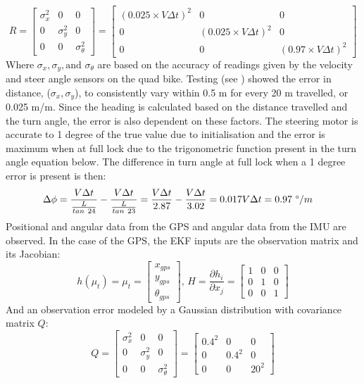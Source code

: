 \documentclass[main.tex]{subfiles}
\begin{document}
\[
R =
\begin{bmatrix}
    \sigma_x^2	&	0	&	0\\
    0	&	\sigma_y^2	&	0\\
    0	&	0	&	\sigma_\theta^2
\end{bmatrix}
=
\begin{bmatrix}
    (0.025 \times V\Delta t)^2	&	0	&	0\\
    0	&	(0.025 \times V\Delta t)^2	&	0\\
    0	&	0	&	(0.97 \times V\Delta t)^2
\end{bmatrix}
\]
Where $\sigma_x, \sigma_y, \textrm{and } \sigma_\theta$ are based on the accuracy of readings given by the velocity and steer angle sensors on the quad bike. Testing (see ) showed the error in distance, ($\sigma_x, \sigma_y$), to consistently vary within 0.5 m for every 20 m travelled, or 0.025 m/m. Since the heading is calculated based on the distance travelled and the turn angle, the error is also dependent on these factors. The steering motor is accurate to 1 degree of the true value due to initialisation and the error is maximum when at full lock due to the trigonometric function present in the turn angle equation below. The difference in turn angle at full lock when a 1 degree error is present is then:
\begin{align*}
&\Delta\phi = \frac{V\Delta t}{\frac{L}{tan\ 24}} - \frac{V\Delta t}{\frac{L}{tan\ 23}} = \frac{V\Delta t}{2.87} - \frac{V\Delta t}{3.02} = 0.017V\Delta t = 0.97\ \degree/m
\end{align*}
Positional and angular data from the GPS and angular data from the IMU are observed. In the case of the GPS, the EKF inputs are the observation matrix and its Jacobian:
\[
h(\mu_t) = \mu_t = 
\begin{bmatrix}
    x_{gps}\\
    y_{gps}\\
    \theta_{gps}
\end{bmatrix}
\textrm{, } H = \frac{\partial h_i}{\partial x_j} = 
\begin{bmatrix}
    1	&	0	&	0\\
    0	&	1	&	0\\
    0	&	0	&	1
\end{bmatrix}
\]
And an observation error modeled by a Gaussian distribution with covariance matrix $Q$:
\[
Q = 
\begin{bmatrix}
    \sigma_x^2	&	0	&	0\\
    0	&	\sigma_y^2	&	0\\
    0	&	0	&	\sigma_\theta^2
\end{bmatrix}
=
\begin{bmatrix}
    0.4^2	&	0	&	0\\
    0	&	0.4^2	&	0\\
    0	&	0	&	20^2
\end{bmatrix}
\]
\end{document}
